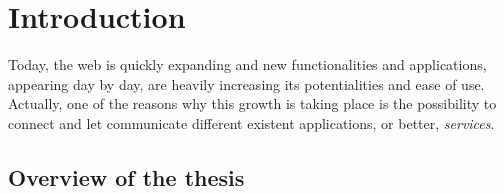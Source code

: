 \section{Introduction}
Today, the web is quickly expanding and new functionalities and applications, appearing day by day, are heavily increasing its potentialities and ease of use. Actually, one of the reasons why this growth is taking place is the possibility to connect and let communicate different existent applications, or better, \textit{services}.




 




\subsection{Overview of the thesis}

